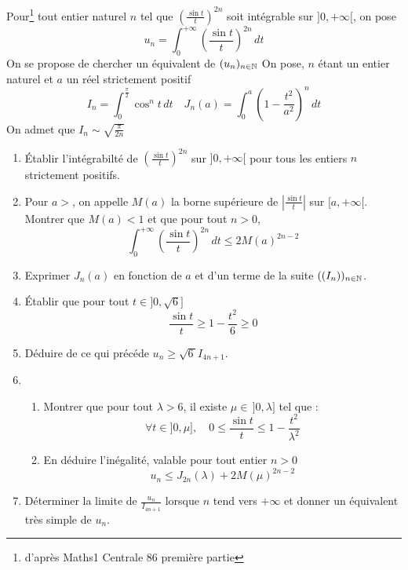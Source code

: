 Pour\footnote{d'après Maths1 Centrale 86 première partie} tout entier naturel $n$ tel que $(\frac{\sin t}{t})^{2n}$ soit intégrable
sur $]0,+\infty[$, on pose 
\[u_{n}=\int_0^{+\infty}(\frac{\sin t}{t})^{2n}\,dt\]
On se propose de chercher un équivalent de $(u_n)_{n\in\mathbb{N}}$
\newline On pose, $n$ étant un entier naturel et $a$ un réel strictement
positif
\[I_n=\int_0^{\frac{\pi}{2}}\cos^n t\,dt\quad
J_n(a)=\int_0^a(1-\frac{t^2}{a^2})^n\,dt\]
On admet que $I_n\sim\sqrt{\frac{\pi}{2n}}$
\begin{enumerate}
\item \'{E}tablir l'intégrabilté de $(\frac{\sin t}{t})^{2n}$ sur
$]0,+\infty[$ pour tous les entiers $n$ strictement positifs.
\item Pour $a>$, on appelle $M(a)$ la borne supérieure de $|\frac{\sin
t}{t}|$ sur $[a,+\infty[$. Montrer que $M(a)<1$ et que pour tout $n>0$,
\[\int_0^{+\infty}(\frac{\sin t}{t})^{2n}\,dt\leq 2M(a)^{2n-2}\]
\item Exprimer $J_n(a)$ en fonction de $a$ et d'un terme de la suite
$((I_n))_{n\in\mathbb{N}}$.
\item \'{E}tablir que pour tout $t\in ]0,\sqrt{6}]$
\[\frac{\sin t}{t}\geq 1-\frac{t^2}{6}\geq 0\]
\item Déduire de ce qui précéde $u_n\geq\sqrt{6\,}I_{4n+1}$.
\item\begin{enumerate}
\item Montrer que pour tout $\lambda >6$, il existe $\mu \in\, ]0,\lambda]$
tel que :
\[\forall t \in ]0,\mu],\quad 0\leq \frac{\sin t}{t}\leq 1-\frac{t^2}{\lambda^2}\]
\item En déduire l'inégalité, valable pour tout entier $n>0$
\[u_n\leq J_{2n}(\lambda)+2M(\mu)^{2n-2}\]
\end{enumerate} 
\item Déterminer la limite de $\frac{u_n}{I_{4n+1}}$ lorsque $n$ tend
vers $+\infty$ et donner un équivalent très simple de $u_n$.
\end{enumerate} 
